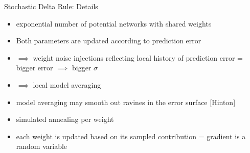 \documentclass{beamer}
\begin{document}
\begin{frame}{Stochastic Delta Rule: Details}

\begin{itemize}
\item exponential number of potential networks with shared weights

\vfill

\item Both parameters are updated according to prediction error
\item $\implies$ weight noise injections reflecting local history of prediction error = bigger error $\implies$ bigger $\sigma$
\item $\implies$ local model averaging
\item model averaging may smooth out ravines in the
error surface [Hinton]

\vfill

\item simulated annealing per weight
\item each weight is updated based on its sampled contribution = gradient is a random variable

\end{itemize}

\end{frame}
\end{document}
